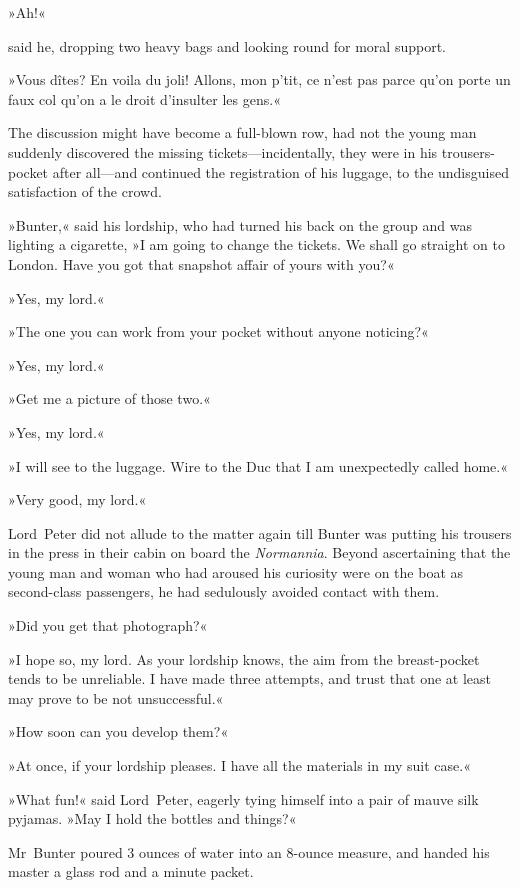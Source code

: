 \begin{french}»Ah!«\end{french} said he, dropping two heavy bags and looking round for moral support. \begin{french}»Vous dîtes? En voila du joli! Allons, mon p'tit, ce n'est pas parce qu'on porte un faux col qu'on a le droit d'insulter les gens.«\end{french}

The discussion might have become a full-blown row, had not the young man suddenly discovered the missing tickets—incidentally, they were in his trousers-pocket after all—and continued the registration of his luggage, to the undisguised satisfaction of the crowd.

»Bunter,« said his lordship, who had turned his back on the group and was lighting a cigarette, »I am going to change the tickets. We shall go straight on to London. Have you got that snapshot affair of yours with you?«

»Yes, my lord.«

»The one you can work from your pocket without anyone noticing?«

»Yes, my lord.«

»Get me a picture of those two.«

»Yes, my lord.«

»I will see to the luggage. Wire to the Duc that I am unexpectedly called home.«

»Very good, my lord.«

Lord~Peter did not allude to the matter again till Bunter was putting his trousers in the press in their cabin on board the \textit{Normannia}. Beyond ascertaining that the young man and woman who had aroused his curiosity were on the boat as second-class passengers, he had sedulously avoided contact with them.

»Did you get that photograph?«

»I hope so, my lord. As your lordship knows, the aim from the breast-pocket tends to be unreliable. I have made three attempts, and trust that one at least may prove to be not unsuccessful.«

»How soon can you develop them?«

»At once, if your lordship pleases. I have all the materials in my suit case.«

»What fun!« said Lord~Peter, eagerly tying himself into a pair of mauve silk pyjamas. »May I hold the bottles and things?«

Mr~Bunter poured 3 ounces of water into an 8-ounce measure, and handed his master a glass rod and a minute packet.

